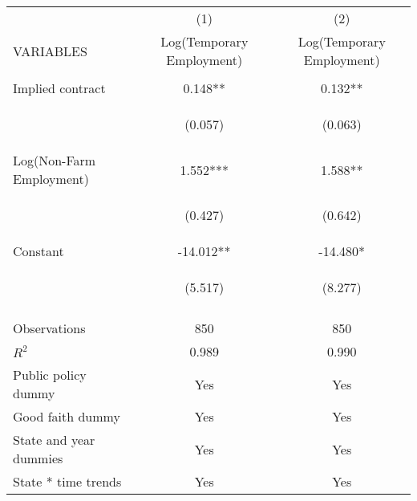 \begin{center}
\begin{tabular}{lcc} \hline
 & (1) & (2) \\
VARIABLES & Log(Temporary Employment) & Log(Temporary Employment) \\ \hline
\vspace{4pt} & \begin{footnotesize}\end{footnotesize} & \begin{footnotesize}\end{footnotesize} \\
Implied contract & 0.148** & 0.132** \\
\vspace{4pt} & \begin{footnotesize}(0.057)\end{footnotesize} & \begin{footnotesize}(0.063)\end{footnotesize} \\
Log(Non-Farm Employment) & 1.552*** & 1.588** \\
\vspace{4pt} & \begin{footnotesize}(0.427)\end{footnotesize} & \begin{footnotesize}(0.642)\end{footnotesize} \\
Constant & -14.012** & -14.480* \\
 & \begin{footnotesize}(5.517)\end{footnotesize} & \begin{footnotesize}(8.277)\end{footnotesize} \\
\vspace{4pt} & \begin{footnotesize}\end{footnotesize} & \begin{footnotesize}\end{footnotesize} \\
Observations & 850 & 850 \\
$R^2$ & 0.989 & 0.990 \\
Public policy dummy & Yes & Yes \\
Good faith dummy & Yes & Yes \\
State and year dummies & Yes & Yes \\
State * time trends & Yes & Yes \\

\end{tabular}
\end{center}
